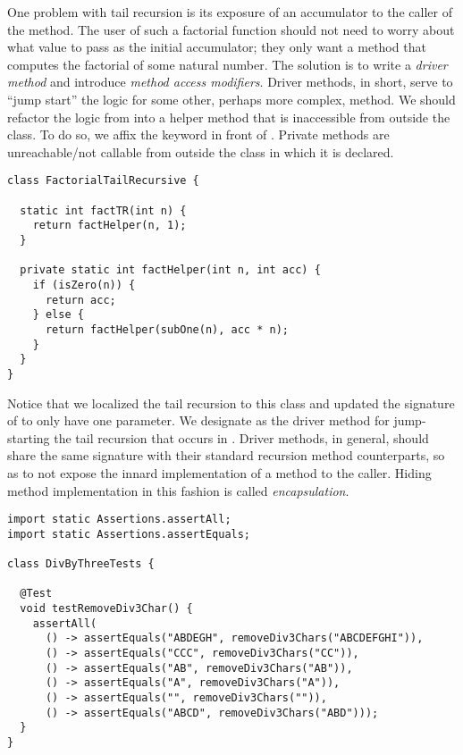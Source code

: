 One problem with tail recursion is its exposure of an accumulator to the caller of the method. The user of such a factorial function should not need to worry about what value to pass as the initial accumulator; they only want a method that computes the factorial of some natural number. The solution is to write a \emph{driver method} and introduce \emph{method access modifiers}. Driver methods, in short, serve to ``jump start'' the logic for some other, perhaps more complex, method. We should refactor the logic from  into a helper method that is inaccessible from outside the class. To do so, we affix the  keyword in front of . Private methods are unreachable/not callable from outside the class in which it is declared.


\begin{lstlisting}[language=MyJava]
class FactorialTailRecursive {
  
  static int factTR(int n) {
    return factHelper(n, 1);
  }

  private static int factHelper(int n, int acc) {
    if (isZero(n)) {
      return acc;
    } else {
      return factHelper(subOne(n), acc * n);
    }
  }
}
\end{lstlisting}

Notice that we localized the tail recursion to this class and updated the signature of  to only have one parameter. We designate  as the driver method for jump-starting the tail recursion that occurs in . Driver methods, in general, should share the same signature with their standard recursion method counterparts, so as to not expose the innard implementation of a method to the caller. Hiding method implementation in this fashion is called \emph{encapsulation}. 


\enlargethispage{-3\baselineskip}
\begin{lstlisting}[language=MyJava]
import static Assertions.assertAll;
import static Assertions.assertEquals;

class DivByThreeTests {

  @Test
  void testRemoveDiv3Char() {
    assertAll(
      () -> assertEquals("ABDEGH", removeDiv3Chars("ABCDEFGHI")),
      () -> assertEquals("CCC", removeDiv3Chars("CC")),
      () -> assertEquals("AB", removeDiv3Chars("AB")),
      () -> assertEquals("A", removeDiv3Chars("A")),
      () -> assertEquals("", removeDiv3Chars("")),
      () -> assertEquals("ABCD", removeDiv3Chars("ABD")));
  }
}
\end{lstlisting}

